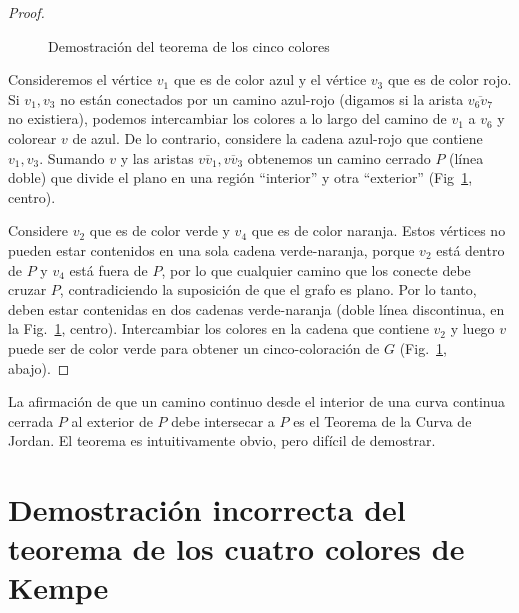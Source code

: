 \begin{proof}
\begin{figure}
\begin{center}
\end{center}
\caption{Demostración del teorema de los cinco colores}\label{f.five-color-proof}
\end{figure}

Consideremos el vértice $v_1$ que es de color azul y el vértice $v_3$ que es de color rojo. Si $v_1,v_3$ no están conectados por un camino azul-rojo (digamos si la arista $\overline{v_6v_7}$ no existiera), podemos intercambiar los colores a lo largo del camino de $v_1$ a $v_6$ y colorear $v$ de azul. De lo contrario, considere la cadena azul-rojo que contiene $v_1,v_3$. Sumando $v$ y las aristas $\overline{vv_1},\overline{vv_3}$ obtenemos un camino cerrado $P$ (línea doble) que divide el plano en una región ``interior'' y otra ``exterior'' (Fig~\ref{f.five-color-proof}, centro).

Considere $v_2$ que es de color verde y $v_4$ que es de color naranja. Estos vértices no pueden estar contenidos en una sola cadena verde-naranja, porque $v_2$ está dentro de $P$ y $v_4$ está fuera de $P$, por lo que cualquier camino que los conecte debe cruzar $P$, contradiciendo la suposición de que el grafo es plano. Por lo tanto, deben estar contenidas en dos cadenas verde-naranja (doble línea discontinua, en la Fig.~\ref{f.five-color-proof}, centro).
Intercambiar los colores en la cadena que contiene $v_2$ y luego $v$ puede ser de color verde para obtener un cinco-coloración de $G$ (Fig.~\ref{f.five-color-proof}, abajo).
\end{proof}

\begin{advanced}
La afirmación de que un camino continuo desde el interior de una curva continua cerrada $P$ al exterior de $P$ debe intersecar a $P$ es el Teorema de la Curva de Jordan. El teorema es intuitivamente obvio, pero difícil de demostrar.
\end{advanced}


\section{Demostración incorrecta del teorema de los cuatro colores de Kempe}\label{s.kempe}

